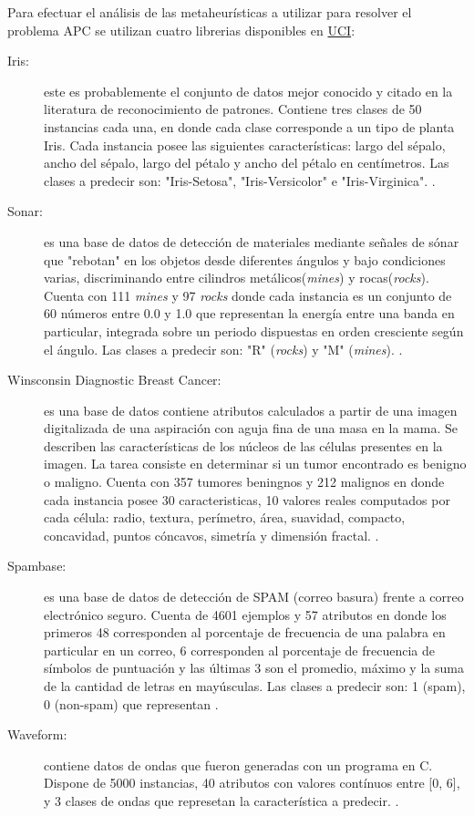 \documentclass{ci5652}
\begin{document}
Para efectuar el análisis de las metaheurísticas a utilizar para resolver el
problema APC se utilizan cuatro librerias disponibles en
\href{http://archive.ics.uci.edu/ml/index.php}{UCI}:

\begin{description}
  \item [Iris:] este es probablemente el conjunto de datos mejor conocido y citado
  en la literatura de reconocimiento de patrones. Contiene tres clases de 50
  instancias cada una, en donde cada clase corresponde a un tipo de planta Iris.
  Cada instancia posee las siguientes características: largo del sépalo, ancho
  del sépalo, largo del pétalo y ancho del pétalo en centímetros. Las clases a
  predecir son: "Iris-Setosa", "Iris-Versicolor" e "Iris-Virginica".
  \cite{UCI_Iris}.

  \item [Sonar:] es una base de datos de detección de materiales mediante señales
  de sónar que "rebotan" en los objetos desde diferentes ángulos y bajo
  condiciones varias, discriminando entre cilindros metálicos(\textit{mines}) y
  rocas(\textit{rocks}). Cuenta con 111 \textit{mines} y 97 \textit{rocks} donde
  cada instancia es un conjunto de 60 números entre 0.0 y 1.0 que representan la
  energía entre una banda en particular, integrada sobre un periodo dispuestas
  en orden cresciente según el ángulo. Las clases a predecir son: "R"
  (\textit{rocks}) y "M" (\textit{mines}). \cite{UCI_Sonar}.

  \item [Winsconsin Diagnostic Breast Cancer:] es una base de datos contiene
  atributos calculados a partir de una imagen digitalizada de una aspiración con
  aguja fina de una masa en la mama. Se describen las características de los
  núcleos de las células presentes en la imagen. La tarea consiste en determinar
  si un tumor encontrado es benigno o maligno. Cuenta con 357 tumores beningnos
  y 212 malignos en donde cada instancia posee 30 caracteristicas, 10 valores
  reales computados por cada célula: radio, textura, perímetro, área, suavidad,
  compacto, concavidad, puntos cóncavos, simetría y dimensión fractal.
  \cite{UCI_WDBC}.

  \item [Spambase:] es una base de datos de detección de SPAM (correo basura)
  frente a correo electrónico seguro. Cuenta de 4601 ejemplos y 57 atributos en
  donde los primeros 48 corresponden al porcentaje de frecuencia de una palabra
  en particular en un correo, 6 corresponden al porcentaje de frecuencia de
  símbolos de puntuación y las últimas 3 son el promedio, máximo y la suma de la
  cantidad de letras en mayúsculas. Las clases a predecir son: 1 (spam), 0
  (non-spam) que representan \cite{UCI_SpamBase}.

  \item [Waveform:] contiene datos de ondas que fueron generadas con un programa
  en C. Dispone de 5000 instancias, 40 atributos con valores contínuos entre
  [0, 6], y 3 clases de ondas que represetan la característica a predecir.
  \cite{UCI_Waveform}.

\end{description}
\end{document}
